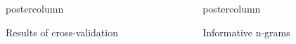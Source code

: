\documentclass[final]{beamer}\usepackage[]{graphicx}\usepackage[]{color}
\newenvironment{knitrout}{}{} %
\newlength{\columnheight}
\begin{document}
\begin{frame}
\begin{columns}
\begin{column}{.53\textwidth}
\begin{beamercolorbox}[center,wd=\textwidth]{postercolumn}
\begin{minipage}[T]{.95\textwidth}
{\begin{block}{Results of cross-validation}
\end{block}
\vfill


%     
%     
% 
% 
% 
% 
%       

\vfill




}
\end{minipage}
\end{beamercolorbox}
\end{column}



\begin{column}{.48\textwidth}
\begin{beamercolorbox}[center,wd=\textwidth]{postercolumn}
\begin{minipage}[T]{.95\textwidth}  
\parbox[t][\columnheight]{\textwidth}
{




\begin{block}{Informative n-grams}
\begin{knitrout}
\color{fgcolor}


\end{knitrout}
\end{block}}
\end{minipage}
\end{beamercolorbox}
\end{column}
\end{columns}
\end{frame}
\end{document}
